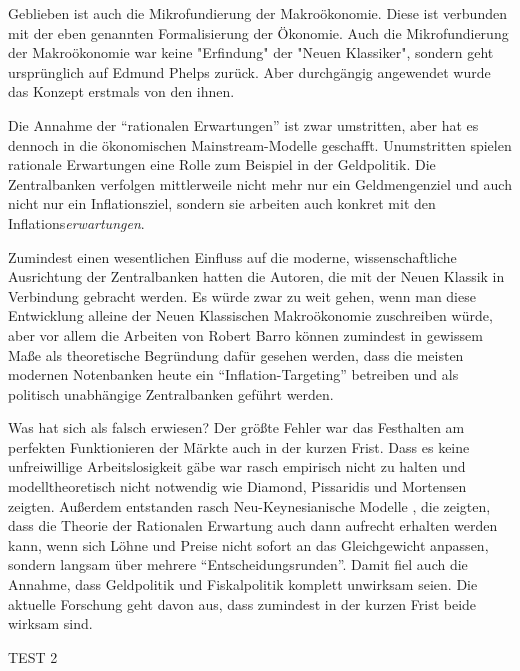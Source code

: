 Geblieben ist auch die Mikrofundierung der Makroökonomie. Diese ist verbunden mit der eben genannten Formalisierung der Ökonomie. Auch die Mikrofundierung der Makroökonomie war keine "Erfindung" der "Neuen Klassiker", sondern geht ursprünglich auf Edmund Phelps zurück. Aber durchgängig angewendet wurde das Konzept erstmals von den ihnen.

Die Annahme der "`rationalen Erwartungen"' ist zwar umstritten, aber hat es dennoch in die ökonomischen Mainstream-Modelle geschafft. Unumstritten spielen rationale Erwartungen eine Rolle zum Beispiel in der Geldpolitik. Die Zentralbanken verfolgen mittlerweile nicht mehr nur ein Geldmengenziel und auch nicht nur ein Inflationsziel, sondern sie arbeiten auch konkret mit den Inflations\textit{erwartungen}.

Zumindest einen wesentlichen Einfluss auf die moderne, wissenschaftliche Ausrichtung der Zentralbanken hatten die Autoren, die mit der Neuen Klassik in Verbindung gebracht werden. Es würde zwar zu weit gehen, wenn man diese Entwicklung alleine der Neuen Klassischen Makroökonomie zuschreiben würde, aber vor allem die Arbeiten von Robert Barro können zumindest in gewissem Maße als theoretische Begründung dafür gesehen werden, dass die meisten modernen Notenbanken heute ein "`Inflation-Targeting"' betreiben und als politisch unabhängige Zentralbanken geführt werden.


Was hat sich als falsch erwiesen? Der größte Fehler war das Festhalten am perfekten Funktionieren der Märkte auch in der kurzen Frist. Dass es keine unfreiwillige Arbeitslosigkeit gäbe war rasch empirisch nicht zu halten und modelltheoretisch nicht notwendig wie Diamond, Pissaridis und Mortensen zeigten. Außerdem entstanden rasch Neu-Keynesianische Modelle , die zeigten, dass die Theorie der Rationalen Erwartung auch dann aufrecht erhalten werden kann, wenn sich Löhne und Preise nicht sofort an das Gleichgewicht anpassen, sondern langsam über mehrere "`Entscheidungsrunden"'. Damit fiel auch die Annahme, dass Geldpolitik und Fiskalpolitik komplett unwirksam seien. Die aktuelle Forschung geht davon aus, dass zumindest in der kurzen Frist beide wirksam sind.

TEST 2




